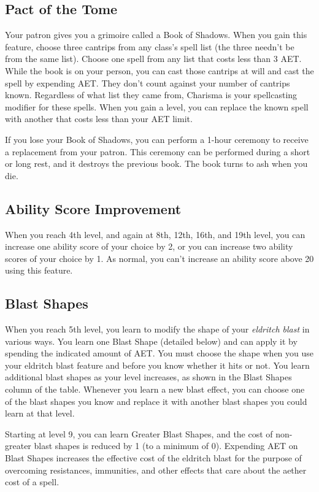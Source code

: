 \subsection{Pact of the Tome}

Your patron gives you a grimoire called a Book of Shadows. When you gain this feature, choose three cantrips from any class's spell list (the three needn't be from the same list). Choose one spell from any list that costs less than 3 AET. While the book is on your person, you can cast those cantrips at will and cast the spell by expending AET. They don't count against your number of cantrips known. Regardless of what list they came from, Charisma is your spellcasting modifier for these spells. When you gain a level, you can replace the known spell with another that costs less than your AET limit.

If you lose your Book of Shadows, you can perform a 1-hour ceremony to receive a replacement from your patron. This ceremony can be performed during a short or long rest, and it destroys the previous book. The book turns to ash when you die.

\subsection{Ability Score Improvement}

When you reach 4th level, and again at 8th, 12th, 16th, and 19th level, you can increase one ability score of your choice by 2, or you can increase two ability scores of your choice by 1. As normal, you can't increase an ability score above 20 using this feature.

\subsection{Blast Shapes}

When you reach 5th level, you learn to modify the shape of your \textit{eldritch blast} in various ways. You learn one Blast Shape (detailed below) and can apply it by spending the indicated amount of AET. You must choose the shape when you use your eldritch blast feature and before you know whether it hits or not. You learn additional blast shapes as your level increases, as shown in the Blast Shapes column of the  table. Whenever you learn a new blast effect, you can choose one of the blast shapes you know and replace it with another blast shapes you could learn at that level.

Starting at level 9, you can learn Greater Blast Shapes, and the cost of non-greater blast shapes is reduced by 1 (to a minimum of 0). Expending AET on Blast Shapes increases the effective cost of the eldritch blast for the purpose of overcoming resistances, immunities, and other effects that care about the aether cost of a spell.

